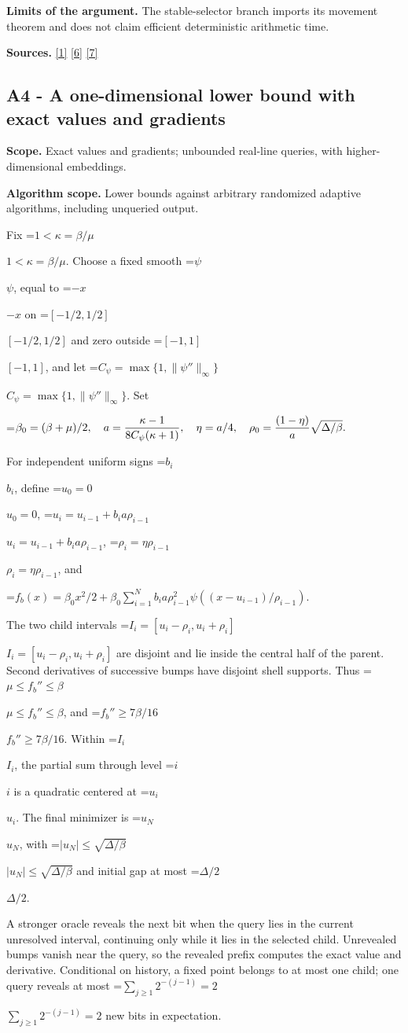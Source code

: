 \documentclass[10pt,a4paper]{article}
\newcommand{\AtlasMath}[1]{\par\begingroup\centering\setbox0=\hbox{$\displaystyle #1$}\ifdim\wd0>1.4\linewidth\typeout{ATLAS WIDE FORMULA: \the\wd0}\fi\ifdim\wd0>\linewidth\resizebox{\linewidth}{!}{\box0}\else\box0\fi\par\endgroup}
\newcommand{\AtlasInlineMath}[1]{\begingroup\setbox0=\hbox{$#1$}\ifdim\wd0>.4\linewidth\endgroup\AtlasMath{#1}\else\endgroup$#1$\fi}
\begin{document}
\textbf{Limits of the argument.} The stable-selector branch imports its movement theorem and does not claim efficient deterministic arithmetic time.

\textbf{Sources.} \href{https://arxiv.org/pdf/1405.4980}{[1]} \href{https://www2.isye.gatech.edu/~nemirovs/MOR_AccuracyCertificates.pdf}{[6]} \href{https://arxiv.org/pdf/2609.20701}{[7]}

\subsection{A4 - A one-dimensional lower bound with exact values and gradients}
\textbf{Scope.} Exact values and gradients; unbounded real-line queries, with higher-dimensional embeddings.

\textbf{Algorithm scope.} Lower bounds against arbitrary randomized adaptive algorithms, including unqueried output.

Fix \AtlasInlineMath{1<\kappa=\beta/\mu}. Choose a fixed smooth \AtlasInlineMath{\psi}, equal to \AtlasInlineMath{-x} on \AtlasInlineMath{[-1/2,1/2]} and zero outside \AtlasInlineMath{[-1,1]}, and let \AtlasInlineMath{C_\psi=\max\{1,\|\psi''\|_\infty\}}. Set

\AtlasMath{\beta_0=(\beta+\mu)/2,\quad a={\kappa-1\over8C_\psi(\kappa+1)},\quad
\eta=a/4,\quad \rho_0={(1-\eta)\over a}\sqrt{\Delta/\beta}.}

For independent uniform signs \AtlasInlineMath{b_i}, define \AtlasInlineMath{u_0=0},
\AtlasInlineMath{u_i=u_{i-1}+b_i a\rho_{i-1}}, \AtlasInlineMath{\rho_i=\eta\rho_{i-1}}, and

\AtlasMath{f_b(x)=\beta_0x^2/2+
\beta_0\sum_{i=1}^N b_i a\rho_{i-1}^2
\psi((x-u_{i-1})/\rho_{i-1}).}

The two child intervals \AtlasInlineMath{I_i=[u_i-\rho_i,u_i+\rho_i]} are disjoint and lie inside the central half of the parent. Second derivatives of successive bumps have disjoint shell supports. Thus \AtlasInlineMath{\mu\le f_b''\le\beta}, and \AtlasInlineMath{f_b''\ge7\beta/16}. Within \AtlasInlineMath{I_i}, the partial sum through level \AtlasInlineMath{i} is a quadratic centered at \AtlasInlineMath{u_i}. The final minimizer is \AtlasInlineMath{u_N}, with \AtlasInlineMath{|u_N|\le\sqrt{\Delta/\beta}} and initial gap at most \AtlasInlineMath{\Delta/2}.

A stronger oracle reveals the next bit when the query lies in the current unresolved interval, continuing only while it lies in the selected child. Unrevealed bumps vanish near the query, so the revealed prefix computes the exact value and derivative. Conditional on history, a fixed point belongs to at most one child; one query reveals at most \AtlasInlineMath{\sum_{j\ge1}2^{-(j-1)}=2} new bits in expectation.
\end{document}
